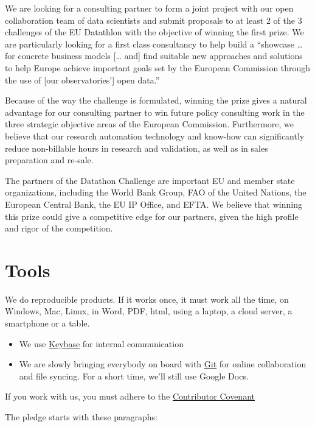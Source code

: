 \documentclass[
  a4paper,
  openany, a4paper, oneside]{book}
\begin{document}
We are looking for a consulting partner to form a joint project with our open collaboration team of data scientists and submit proposals to at least 2 of the 3 challenges of the EU Datathlon with the objective of winning the first prize. We are particularly looking for a first class consultancy to help build a ``showcase \ldots{} for concrete business models {[}\ldots{} and{]} find suitable new approaches and solutions to help Europe achieve important goals set by the European Commission through the use of {[}our observatories'{]} open data.''

Because of the way the challenge is formulated, winning the prize gives a natural advantage for our consulting partner to win future policy consulting work in the three strategic objective areas of the European Commission. Furthermore, we believe that our research automation technology and know-how can significantly reduce non-billable hours in research and validation, as well as in sales preparation and re-sale.

The partners of the Datathon Challenge are important EU and member state organizations, including the World Bank Group, FAO of the United Nations, the European Central Bank, the EU IP Office, and EFTA. We believe that winning this prize could give a competitive edge for our partners, given the high profile and rigor of the competition.

\hypertarget{tools}{%
\chapter{Tools}\label{tools}}

We do reproducible products. If it works once, it must work all the time, on Windows, Mac, Linux, in Word, PDF, html, using a laptop, a cloud server, a smartphone or a table.

\begin{itemize}
\item
  We use \protect\hyperlink{keybase}{Keybase} for internal communication
\item
  We are slowly bringing everybody on board with \protect\hyperlink{github}{Git} for online collaboration and file syncing. For a short time, we'll still use Google Docs.
\end{itemize}

If you work with us, you must adhere to the \href{https://www.contributor-covenant.org/version/2/0/code_of_conduct/}{Contributor Covenant}

The pledge starts with these paragraphs:
\end{document}
